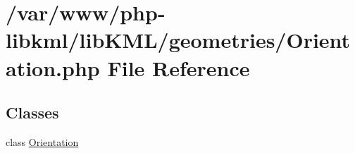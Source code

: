 \hypertarget{Orientation_8php}{
\section{/var/www/php-\/libkml/libKML/geometries/Orientation.php File Reference}
\label{d6/d5c/Orientation_8php}
}
\subsection*{Classes}
\begin{DoxyCompactItemize}
\item 
class \hyperlink{classOrientation}{Orientation}
\end{DoxyCompactItemize}
